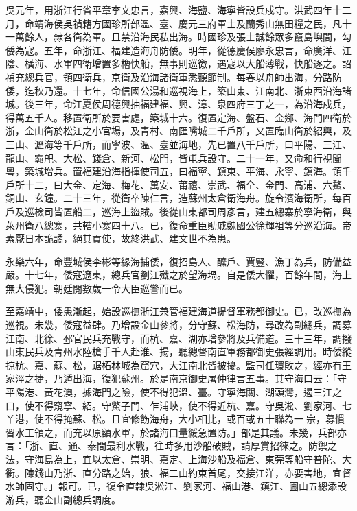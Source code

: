 吳元年，用浙江行省平章李文忠言，嘉興、海鹽、海寧皆設兵戍守。洪武四年十二月，命靖海侯吳禎籍方國珍所部溫、臺、慶元三府軍士及蘭秀山無田糧之民，凡十一萬餘人，隸各衛為軍。且禁沿海民私出海。時國珍及張士誠餘眾多竄島嶼間，勾倭為寇。五年，命浙江、福建造海舟防倭。明年，從德慶侯廖永忠言，命廣洋、江陰、橫海、水軍四衛增置多櫓快船，無事則巡徼，遇寇以大船薄戰，快船逐之。詔禎充總兵官，領四衛兵，京衛及沿海諸衛軍悉聽節制。每春以舟師出海，分路防倭，迄秋乃還。十七年，命信國公湯和巡視海上，築山東、江南北、浙東西沿海諸城。後三年，命江夏侯周德興抽福建福、興、漳、泉四府三丁之一，為沿海戍兵，得萬五千人。移置衛所於要害處，築城十六。復置定海、盤石、金鄉、海門四衛於浙，金山衛於松江之小官場，及青村、南匯嘴城二千戶所，又置臨山衛於紹興，及三山、瀝海等千戶所，而寧波、溫、臺並海地，先已置八千戶所，曰平陽、三江、龍山、霩戺、大松、錢倉、新河、松門，皆屯兵設守。二十一年，又命和行視閩粵，築城增兵。置福建沿海指揮使司五，曰福寧、鎮東、平海、永寧、鎮海。領千戶所十二，曰大金、定海、梅花、萬安、莆禧、崇武、福全、金門、高浦、六鰲、銅山、玄鐘。二十三年，從衛卒陳仁言，造蘇州太倉衛海舟。旋令濱海衛所，每百戶及巡檢司皆置船二，巡海上盜賊。後從山東都司周彥言，建五總寨於寧海衛，與萊州衛八總寨，共轄小寨四十八。已，復命重臣勛戚魏國公徐輝祖等分巡沿海。帝素厭日本詭譎，絕其貢使，故終洪武、建文世不為患。

永樂六年，命豐城侯李彬等緣海捕倭，復招島人、醿戶、賈豎、漁丁為兵，防備益嚴。十七年，倭寇遼東，總兵官劉江殲之於望海堝。自是倭大懼，百餘年間，海上無大侵犯。朝廷閱數歲一令大臣巡警而已。

至嘉靖中，倭患漸起，始設巡撫浙江兼管福建海道提督軍務都御史。已，改巡撫為巡視。未幾，倭寇益肆。乃增設金山參將，分守蘇、松海防，尋改為副總兵，調募江南、北徐、邳官民兵充戰守，而杭、嘉、湖亦增參將及兵備道。三十三年，調撥山東民兵及青州水陸槍手千人赴淮、揚，聽總督南直軍務都御史張經調用。時倭縱掠杭、嘉、蘇、松，踞柘林城為窟穴，大江南北皆被擾。監司任環敗之，經亦有王家涇之捷，乃遁出海，復犯蘇州。於是南京御史屠仲律言五事。其守海口云：「守平陽港、黃花澳，據海門之險，使不得犯溫、臺。守寧海關、湖頭灣，遏三江之口，使不得窺寧、紹。守鱉子門、乍浦峽，使不得近杭、嘉。守吳淞、劉家河、七丫港，使不得掩蘇、松。且宜修飭海舟，大小相比，或百或五十聯為一宗，募慣習水工領之，而充以原額水軍，於諸海口量緩急置防。」部是其議。未幾，兵部亦言：「浙、直、通、泰間最利水戰，往時多用沙船破賊，請厚賞招徠之。防禦之法，守海島為上，宜以太倉、崇明、嘉定、上海沙船及福倉、東莞等船守普陀、大衢。陳錢山乃浙、直分路之始，狼、福二山約束首尾，交接江洋，亦要害地，宜督水師固守。」報可。已，復令直隸吳淞江、劉家河、福山港、鎮江、圌山五總添設游兵，聽金山副總兵調度。


